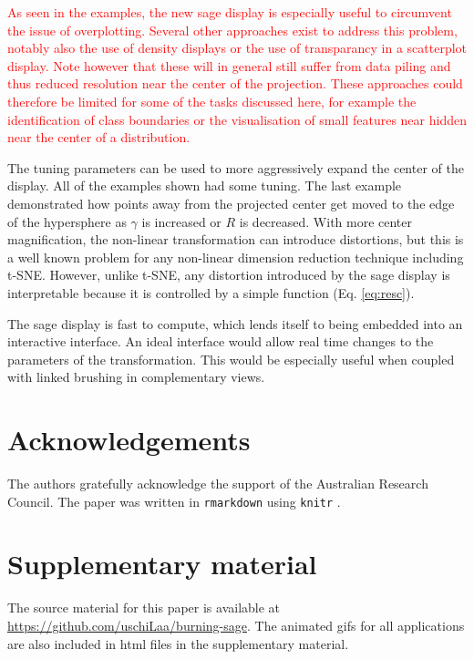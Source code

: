 \documentclass[]{interact}
\theoremstyle{plain}%
\theoremstyle{definition}
\theoremstyle{remark}
\begin{document}
\textcolor{red}{As seen in the examples, the new sage display is especially useful to circumvent the issue of overplotting. Several other approaches exist to address this problem, notably also the use of density displays or the use of transparancy in a scatterplot display. Note however that these will in general still suffer from data piling and thus reduced resolution near the center of the projection. These approaches could therefore be limited for some of the tasks discussed here, for example the identification of class boundaries or the visualisation of small features near hidden near the center of a distribution.}

The tuning parameters can be used to more aggressively expand the center
of the display. All of the examples shown had some tuning. The last
example demonstrated how points away from the projected center get moved
to the edge of the hypersphere as \(\gamma\) is increased or \(R\) is
decreased. With more center magnification, the non-linear transformation
can introduce distortions, but this is a well known problem for any
non-linear dimension reduction technique including t-SNE. However,
unlike t-SNE, any distortion introduced by the sage display is
interpretable because it is controlled by a simple function (Eq.
\ref{eq:resc}).

The sage display is fast to compute, which lends itself to being
embedded into an interactive interface. An ideal interface would allow
real time changes to the parameters of the transformation. This would be
especially useful when coupled with linked brushing in complementary
views.

\hypertarget{acknowledgements}{%
\section*{Acknowledgements}\label{acknowledgements}}

The authors gratefully acknowledge the support of the Australian
Research Council. The paper was written in \texttt{rmarkdown}
\citep{rmarkdown} using \texttt{knitr} \citep{knitr}.

\hypertarget{supplementary-material}{%
\section*{Supplementary material}\label{supplementary-material}}

The source material for this paper is available at
\url{https://github.com/uschiLaa/burning-sage}. The animated gifs for
all applications are also included in html files in the supplementary
material.



\end{document}
